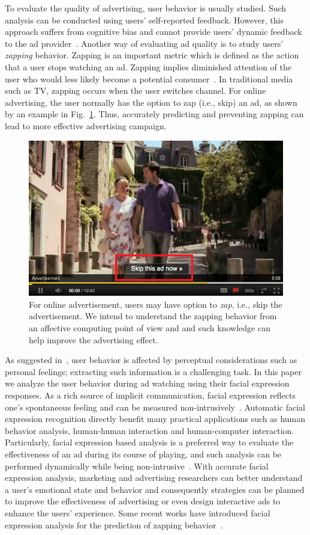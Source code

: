 \documentclass[twoside,leqno,twocolumn]{article}
\begin{document}
To evaluate the quality of advertising, user behavior is usually studied. Such analysis can be conducted using users' self-reported feedback. However, this approach suffers from cognitive bias and cannot provide users' dynamic feedback to the ad provider~\cite{Poels06}. Another way of evaluating ad quality is to study users' \textit{zapping} behavior. Zapping is an important metric which is defined as the action that a user stops watching an ad. Zapping implies diminished attention of the user who would less likely become a potential consumer~\cite{Elpers03}. In traditional media such as TV, zapping occurs when the user switches channel. For online advertising, the user normally has the option to zap (i.e., skip) an ad, as shown by an example in Fig.~\ref{fig:zap_example}. Thus, accurately predicting and preventing zapping can lead to more effective advertising campaign. 

\begin{figure}[t] 
\centering
\includegraphics[width=0.8\columnwidth]{fig/eg_ad}
\caption{For online advertisement, users may have option to \textit{zap}, i.e., skip the advertisement. We intend to understand the zapping behavior from an affective computing point of view and and such knowledge can help improve the advertising effect.}
\label{fig:zap_example}
\end{figure}

As suggested in~\cite{Abbasi_15}, user behavior is affected by perceptual considerations such as personal feelings; extracting such information is a challenging task. In this paper we analyze the user behavior during ad watching using their facial expression responses. As a rich source of implicit communication, facial expression reflects one's spontaneous feeling and can be measured non-intrusively~\cite{Ekman93}. Automatic facial expression recognition directly benefit many practical applications such as human behavior analysis, human-human interaction and human-computer interaction. Particularly, facial expression based analysis is a preferred way to evaluate the effectiveness of an ad during its course of playing, and such analysis can be performed dynamically while being non-intrusive~\cite{Teixeira12}. With accurate facial expression analysis, marketing and advertising researchers can better understand a user's emotional state and behavior and consequently strategies can be planned to improve the effectiveness of advertising or even design interactive ads to enhance the users' experience. Some recent works have introduced facial expression analysis for the prediction of zapping behavior~\cite{Yang_TAC14, Yang_FG15}.
\end{document}
